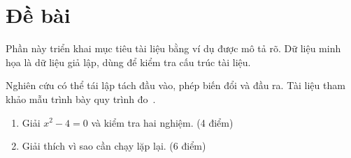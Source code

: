 \section{Đề bài}


\label{sec:chapter1}
Phần này triển khai mục tiêu tài liệu bằng ví dụ được mô tả rõ. Dữ liệu minh họa là dữ liệu giả lập, dùng để kiểm tra cấu trúc tài liệu.

Nghiên cứu có thể tái lập tách đầu vào, phép biến đổi và đầu ra. Tài liệu tham khảo mẫu trình bày quy trình đo~\cite{example}.
\begin{enumerate}
\item Giải $x^2-4=0$ và kiểm tra hai nghiệm. (4 điểm)
\item Giải thích vì sao cần chạy lặp lại. (6 điểm)
\end{enumerate}
